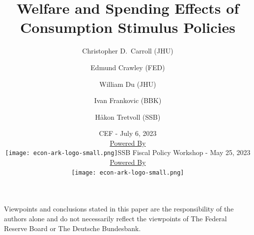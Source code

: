\documentclass[pdflatex,aspectratio=169, handout]{beamer}
\title[Stimulus]{Welfare and Spending Effects of Consumption Stimulus Policies}
\author{
  Christopher D.\ Carroll (JHU)
  \and
  Edmund Crawley (FED)
  \and
  William Du (JHU)
  \and
  Ivan Frankovic (BBK)
  \and
  H{\aa}kon Tretvoll (SSB)
}
\date[\today]{CEF - July 6, 2023  \\ \medskip \medskip \medskip
        \href{https://econ-ark.org/}{\small Powered By} \\ \texttt{[image: econ-ark-logo-small.png]}}}{}
\date[\today]{SSB Fiscal Policy Workshop - May 25, 2023  \\ \medskip \medskip \medskip 
          \href{https://econ-ark.org/}{\small Powered By} \\ \texttt{[image: econ-ark-logo-small.png]}}}{}
\begin{document}


\begin{frame}[plain]
  \titlepage
  
  \footnotesize{Viewpoints and conclusions stated in this paper are the responsibility of the authors alone
    and do not necessarily reflect the viewpoints of The Federal Reserve Board or The Deutsche Bundesbank.}
\end{frame}




%
\end{document}
